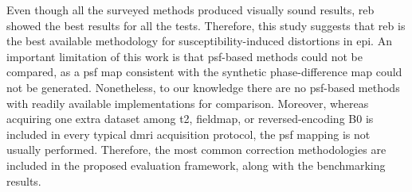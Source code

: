 Even though all the surveyed methods produced visually sound results,
\gls*{reb} showed the best results for all the tests. Therefore,
this study suggests that \gls*{reb} is the best available
methodology for susceptibility-induced distortions in
\gls*{epi}. An important limitation of this work is that 
\gls*{psf}-based methods could not be compared, as a
\gls*{psf} map consistent with the synthetic phase-difference
map could not be generated. Nonetheless, to our knowledge there are
no \gls*{psf}-based methods with readily available implementations
for comparison. Moreover, whereas acquiring one extra dataset
among \gls*{t2}, fieldmap, or reversed-encoding B0 is included in
every typical \gls*{dmri} acquisition protocol, the \gls*{psf} 
mapping is not usually performed. Therefore, the most common
correction methodologies are included in the proposed evaluation
framework, along with the benchmarking results.